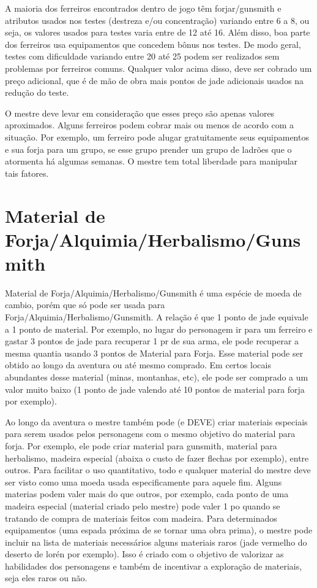 A maioria dos ferreiros encontrados dentro de jogo têm forjar/gunsmith e atributos usados nos testes (destreza e/ou concentração) variando entre 6 a 8, ou seja, os valores usados para testes varia entre de 12 até 16. Além disso, boa parte dos ferreiros usa equipamentos que concedem bônus nos testes. De modo geral, testes com dificuldade variando entre 20 até 25 podem ser realizados sem problemas por ferreiros comuns. Qualquer valor acima disso, deve ser cobrado um preço adicional, que é de mão de obra mais pontos de jade adicionais usados na redução do teste.

O mestre deve levar em consideração que esses preço são apenas valores aproximados. Alguns ferreiros podem cobrar mais ou menos de acordo com a situação. Por exemplo, um ferreiro pode alugar gratuitamente seus equipamentos e sua forja para um grupo, se esse grupo prender um grupo de ladrões que o atormenta há algumas semanas. O mestre tem total liberdade para manipular tais fatores. 


\section{Material de Forja/Alquimia/Herbalismo/Gunsmith}


Material de Forja/Alquimia/Herbalismo/Gunsmith é uma espécie de moeda de cambio, porém que só pode ser usada para Forja/Alquimia/Herbalismo/Gunsmith. A relação é que 1 ponto de jade equivale a 1 ponto de material. Por exemplo, no lugar do personagem ir para um ferreiro e gastar 3 pontos de jade para recuperar 1 pr de sua arma, ele pode recuperar a mesma quantia usando 3 pontos de Material para Forja. Esse material pode ser obtido ao longo da aventura ou até mesmo comprado. Em certos locais abundantes desse material (minas, montanhas, etc), ele pode ser comprado a um valor muito baixo (1 ponto de jade valendo até 10 pontos de material para forja por exemplo).

Ao longo da aventura o mestre também pode (e DEVE) criar materiais especiais para serem usados pelos personagens com o mesmo objetivo do material para forja. Por exemplo, ele pode criar material para gunsmith, material para herbalismo, madeira especial (abaixa o custo de fazer flechas por exemplo), entre outros. Para facilitar o uso quantitativo, todo e qualquer material do mestre deve ser visto como uma moeda usada especificamente para aquele fim. Alguns materias podem valer mais do que outros, por exemplo, cada ponto de uma madeira especial (material criado pelo mestre) pode valer 1 po quando se tratando de compra de materiais feitos com madeira. Para determinados equipamentos (uma espada próxima de se tornar uma obra prima), o mestre pode incluir na lista de materiais necessários alguns materiais raros (jade vermelho do deserto de lorén por exemplo). Isso é criado com o objetivo de valorizar as habilidades dos personagens e também de incentivar a exploração de materiais, seja eles raros ou não.

